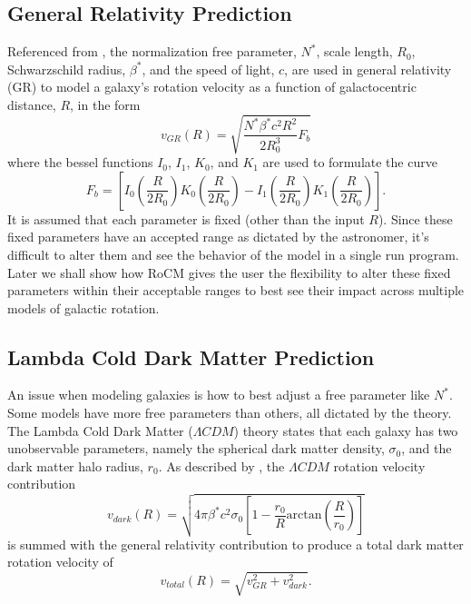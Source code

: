 \documentclass[conference]{IEEEtran-modified}
\begin{document}
\subsection{General Relativity Prediction}
Referenced from \cite{mannheim}, the normalization free parameter, $N^*$, scale length, $R_0$, Schwarzschild radius, $\beta^*$, and the speed of light, $c$, are used in general relativity (GR) to model a galaxy's rotation velocity as a function of galactocentric distance, $R$, in the form
\begin{equation}
v_{GR}(R) = \sqrt{\frac{N^*\beta^*c^2R^2}{2R^3_0}F_b}
\end{equation}
where the bessel functions $I_0$, $I_1$, $K_0$, and $K_1$ are used to formulate the curve
\begin{equation}
F_b = \left[I_0\left(\frac{R}{2R_0}\right)K_0\left(\frac{R}{2R_0}\right)-I_1\left(\frac{R}{2R_0}\right)K_1\left(\frac{R}{2R_0}\right)\right].
\end{equation}
It is assumed that each parameter is fixed (other than the input $R$). Since these fixed parameters have an accepted range as dictated by the astronomer, it's difficult to alter them and see the behavior of the model in a single run program.   Later we shall show how RoCM gives the user the flexibility to alter these fixed parameters within their acceptable ranges to best see their impact across multiple models of galactic rotation. 


\subsection{Lambda Cold Dark Matter Prediction}
An issue when modeling galaxies is how to best adjust a free parameter like $N^*$. Some models have more free parameters than others, all dictated by the theory. The Lambda Cold Dark Matter ($\Lambda CDM$) theory states that each galaxy has two unobservable parameters, namely the spherical dark matter density, $\sigma_0$, and the dark matter halo radius, $r_0$. As described by \cite{mannheim}, the $\Lambda CDM$ rotation velocity contribution
\begin{equation}
v_{dark}(R) = \sqrt{4\pi\beta^*c^2\sigma_0\left[1-\frac{r_0}{R}\text{arctan}\left(\frac{R}{r_0}\right)\right]}
\end{equation}
is summed with the general relativity contribution to produce a total dark matter rotation velocity of 
\begin{equation}
v_{total}(R) = \sqrt{v_{GR}^2 + v_{dark}^2}.
\end{equation}
\end{document}
